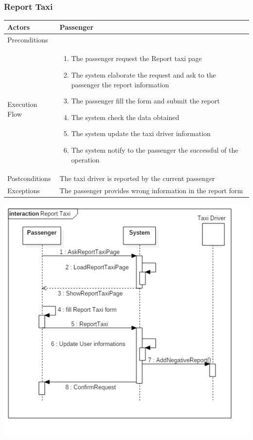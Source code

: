 \documentclass[english]{article}
\providecommand{\tabularnewline}{\\}
\begin{document}
\subsubsection{Report Taxi}

\begin{tabular}{lp{8cm}}
\hline 
Actors  & Passenger \tabularnewline
\hline 
Preconditions  & \tabularnewline
\hline 
Execution Flow  & \begin{enumerate}
\item The passenger request the Report taxi page 
\item The system elaborate the request and ask to the passenger the report
information 
\item The passenger fill the form and submit the report 
\item The system check the data obtained 
\item The system update the taxi driver information 
\item The system notify to the passenger the successful of the operation \end{enumerate}
\tabularnewline
\hline 
Postconditions  & The taxi driver is reported by the current passenger \tabularnewline
\hline 
Exceptions  & The passenger provides wrong information in the report form \tabularnewline
\end{tabular}

\includegraphics[width=\textwidth]{ReportTaxi}
\end{document}
